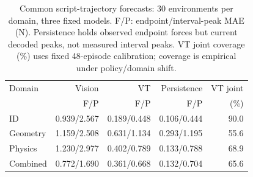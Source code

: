 \begin{table}[t]
\vspace*{5pt}
\centering
\caption{Common script-trajectory forecasts: 30 environments per domain, three fixed models. F/P: endpoint/interval-peak MAE (N). Persistence holds observed endpoint forces but current decoded peaks, not measured interval peaks. VT joint coverage (\%) uses fixed 48-episode calibration; coverage is empirical under policy/domain shift.}
\label{tab:forecast}
\begingroup
\fontsize{8}{9.2}\selectfont
\setlength{\tabcolsep}{2pt}
\renewcommand{\arraystretch}{1.10}
\begin{tabular*}{\columnwidth}{@{\extracolsep{\fill}}lrrrr@{}}
\toprule
Domain & Vision & VT & Persistence & VT joint \\
 & F/P & F/P & F/P & (\%) \\
\midrule
ID & 0.939/2.567 & 0.189/0.448 & 0.106/0.444 & 90.0 \\
Geometry & 1.159/2.508 & 0.631/1.134 & 0.293/1.195 & 55.6 \\
Physics & 1.230/2.977 & 0.402/0.789 & 0.133/0.788 & 68.9 \\
Combined & 0.772/1.690 & 0.361/0.668 & 0.132/0.704 & 65.6 \\
\bottomrule
\end{tabular*}
\endgroup
\end{table}
